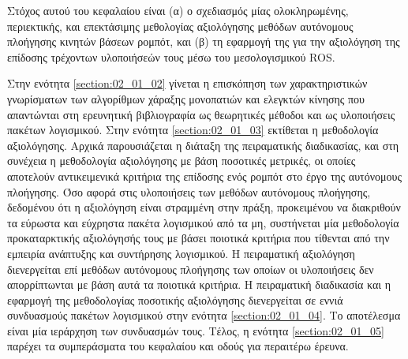 Στόχος αυτού του κεφαλαίου είναι (α) ο σχεδιασμός μίας ολοκληρωμένης,
περιεκτικής, και επεκτάσιμης μεθολογίας αξιολόγησης μεθόδων αυτόνομους
πλοήγησης κινητών βάσεων ρομπότ, και (β) τη εφαρμογή της για την αξιολόγηση της
επίδοσης τρέχοντων υλοποιήσεών τους μέσω του μεσολογισμικού ROS.

Στην ενότητα \ref{section:02_01_02} γίνεται η επισκόπηση των χαρακτηριστικών
γνωρίσματων των αλγορίθμων χάραξης μονοπατιών και ελεγκτών κίνησης που
απαντώνται στη ερευνητική βιβλιογραφία ως θεωρητικές μέθοδοι και ως υλοποιήσεις
πακέτων λογισμικού. Στην ενότητα \ref{section:02_01_03} εκτίθεται η μεθοδολογία
αξιολόγησης. Αρχικά παρουσιάζεται η διάταξη της πειραματικής
διαδικασίας, και στη συνέχεια η μεθοδολογία αξιολόγησης με βάση ποσοτικές
μετρικές, οι οποίες αποτελούν αντικειμενικά κριτήρια της επίδοσης ενός ρομπότ
στο έργο της αυτόνομους πλοήγησης. Όσο αφορά στις υλοποιήσεις των μεθόδων
αυτόνομους πλοήγησης, δεδομένου ότι η αξιολόγηση είναι στραμμένη στην πράξη,
προκειμένου να διακριθούν τα εύρωστα και εύχρηστα πακέτα λογισμικού από τα μη,
συστήνεται μία μεθοδολογία προκαταρκτικής αξιολόγησής τους με βάσει ποιοτικά
κριτήρια που τίθενται από την εμπειρία ανάπτυξης και συντήρησης λογισμικού.  Η
πειραματική αξιολόγηση διενεργείται επί μεθόδων αυτόνομους πλοήγησης των οποίων
οι υλοποιήσεις δεν απορρίπτωνται με βάση αυτά τα ποιοτικά κριτήρια. Η
πειραματική διαδικασία και η εφαρμογή της μεθοδολογίας ποσοτικής αξιολόγησης
διενεργείται σε εννιά συνδυασμούς πακέτων λογισμικού στην ενότητα
\ref{section:02_01_04}. Το αποτέλεσμα είναι μία ιεράρχηση των συνδυασμών τους.
Τέλος, η ενότητα \ref{section:02_01_05} παρέχει τα συμπεράσματα του κεφαλαίου
και οδούς για περαιτέρω έρευνα.
